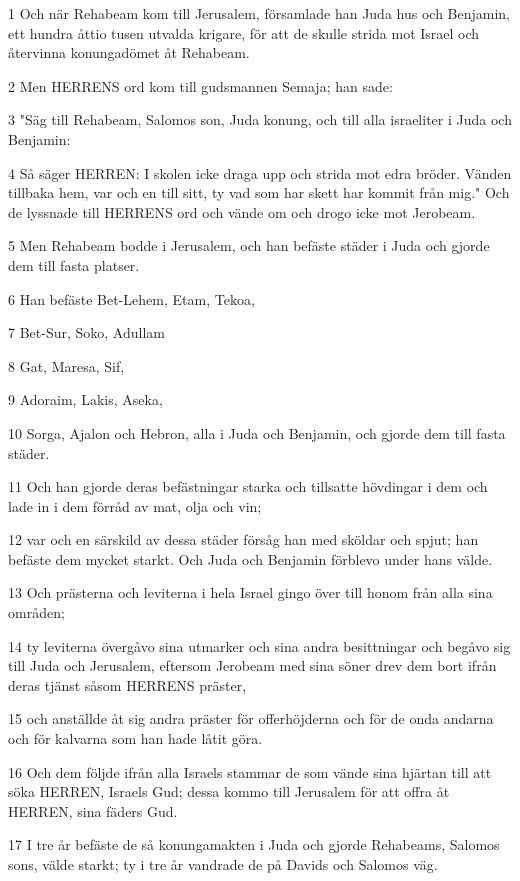\par 1 Och när Rehabeam kom till Jerusalem, församlade han Juda hus och Benjamin, ett hundra åttio tusen utvalda krigare, för att de skulle strida mot Israel och återvinna konungadömet åt Rehabeam.
\par 2 Men HERRENS ord kom till gudsmannen Semaja; han sade:
\par 3 "Säg till Rehabeam, Salomos son, Juda konung, och till alla israeliter i Juda och Benjamin:
\par 4 Så säger HERREN: I skolen icke draga upp och strida mot edra bröder. Vänden tillbaka hem, var och en till sitt, ty vad som har skett har kommit från mig." Och de lyssnade till HERRENS ord och vände om och drogo icke mot Jerobeam.
\par 5 Men Rehabeam bodde i Jerusalem, och han befäste städer i Juda och gjorde dem till fasta platser.
\par 6 Han befäste Bet-Lehem, Etam, Tekoa,
\par 7 Bet-Sur, Soko, Adullam
\par 8 Gat, Maresa, Sif,
\par 9 Adoraim, Lakis, Aseka,
\par 10 Sorga, Ajalon och Hebron, alla i Juda och Benjamin, och gjorde dem till fasta städer.
\par 11 Och han gjorde deras befästningar starka och tillsatte hövdingar i dem och lade in i dem förråd av mat, olja och vin;
\par 12 var och en särskild av dessa städer försåg han med sköldar och spjut; han befäste dem mycket starkt. Och Juda och Benjamin förblevo under hans välde.
\par 13 Och prästerna och leviterna i hela Israel gingo över till honom från alla sina områden;
\par 14 ty leviterna övergåvo sina utmarker och sina andra besittningar och begåvo sig till Juda och Jerusalem, eftersom Jerobeam med sina söner drev dem bort ifrån deras tjänst såsom HERRENS präster,
\par 15 och anställde åt sig andra präster för offerhöjderna och för de onda andarna och för kalvarna som han hade låtit göra.
\par 16 Och dem följde ifrån alla Israels stammar de som vände sina hjärtan till att söka HERREN, Israels Gud; dessa kommo till Jerusalem för att offra åt HERREN, sina fäders Gud.
\par 17 I tre år befäste de så konungamakten i Juda och gjorde Rehabeams, Salomos sons, välde starkt; ty i tre år vandrade de på Davids och Salomos väg.

